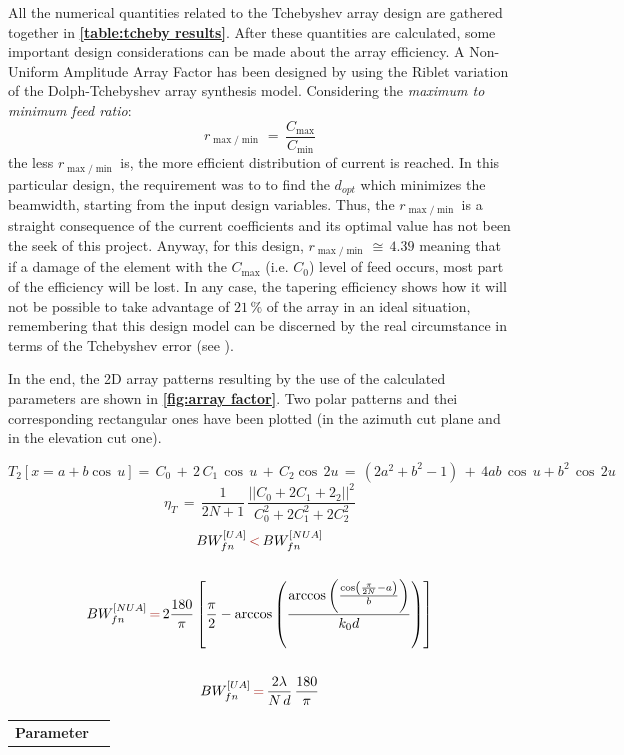 \documentclass[12pt,a4paper]{article}
\begin{document}
{All the numerical quantities related to the Tchebyshev array design are gathered together in \textbf{\cref{table:tcheby results}}. After these quantities are calculated, some important design considerations can be made about the array efficiency. A Non-Uniform Amplitude Array Factor has been designed by using the Riblet variation of the Dolph-Tchebyshev array synthesis model. Considering the \emph{maximum to minimum feed ratio}: \[r_{\max/\min}\,=\,\frac{C_{\max}}{C_{\min}}\] 
the less $r_{\max/\min}$ is, the more efficient distribution of current is reached. In this particular design, the requirement was to to find the $d_{opt}$ which minimizes the beamwidth, starting from the input design variables. Thus, the $r_{\max/\min}$ is a straight consequence of the current coefficients and its optimal value has not been the seek of this project. Anyway, for this design, $r_{\max/\min}\,\cong\,4.39$ meaning that if a damage of the element with the $C_{\max}$ (i.e. $C_0$) level of feed occurs, most part of the efficiency will be lost. In any case, the tapering efficiency shows how it will not be possible to take advantage of $21\,\%$ of the array in an ideal situation, remembering that this design model can be discerned by the real circumstance in terms of the Tchebyshev error (see \textbf{\cite{Balanis1}}). 

\indent

In the end, the 2D array patterns resulting by the use of the calculated parameters are shown in \textbf{\cref{fig:array factor}}. Two polar patterns and thei corresponding rectangular ones have been plotted (in the azimuth cut plane and in the elevation cut one). 

\begin{equation}
T_2\left[x=a+b\cos\,u\right]=\,C_0\,+\,2\,C_1\,\cos\,u\,+\,C_2\cos\,2u\,=\,(2a^2+b^2-1)\,+\,4ab\,\cos\,u+b^2\,\cos\,2u
\label{eq:tcheby poly coeff}
\end{equation}
\begin{equation}
\eta_T\,=\,\frac{1}{2N+1}\,\frac{||C_0+2C_1+2_2||^2}{C_0^2+2C_1^2+2C_2^2}
\label{eq:tapering efficiency}
\end{equation}
\begin{equation}
\begin{gathered}
BW_{fn}^{[UA]}\,{\color{Mahogany}<}\,BW_{fn}^{[NUA]}\\
\\
BW_{fn}^{[NUA]}\,{\color{Mahogany}=}\,2\frac{180}{\pi}\left[\frac{\pi}{2}-\arccos\left(\frac{\arccos\left(\frac{\cos\left(\frac{\pi}{2N}-a\right)}{b}\right)}{k_0d}\right)\right]\\
\\
BW_{fn}^{[UA]}\,{\color{Mahogany}=}\,\frac{2\lambda}{N\,d}\,\frac{180}{\pi}
\end{gathered}
\label{eq:tcheby beamwidth}
\end{equation}
\begin{table}[h] 
\begin{center}
		{\selectfont
\begin{tabular}{||m{6cm}|m{6cm}||}
\hline
\textbf{\color{Mahogany}Parameter}


\end{tabular}}
\end{center}
\end{table}}
\end{document}
